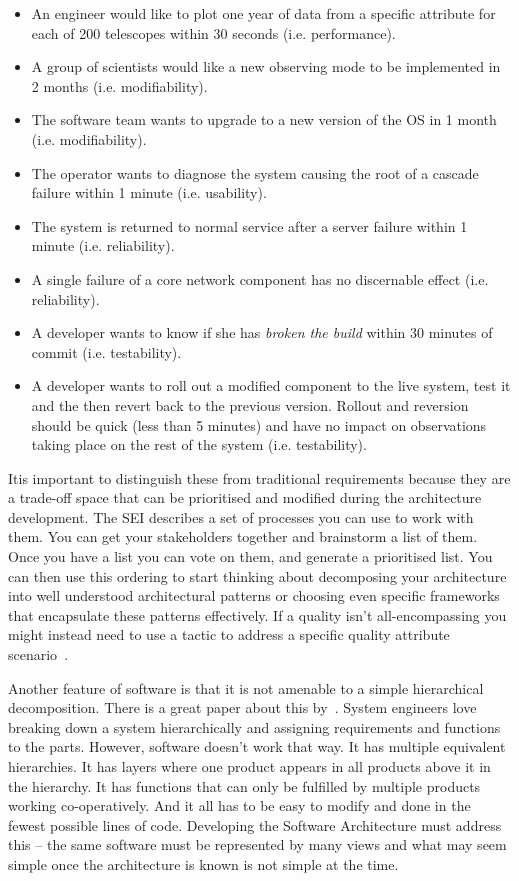 \documentclass[11pt,twoside]{article}
\begin{document}
\begin{itemize}
	\item An engineer would like to plot one year of data from a specific attribute for each 
of 200 telescopes within 30 seconds (i.e. performance).
	\item A group of scientists would like a new observing mode to be implemented in 2 
months (i.e. modifiability). 
	\item The software team wants to upgrade to a new version of the OS in 1 month (i.e. 
modifiability). 
	\item The operator wants to diagnose the system causing the root of a cascade failure 
within 1 minute (i.e. usability). 
	\item The system is returned to normal service after a server failure within 1 minute 
(i.e. reliability). 
	\item A single failure of a core network component has no discernable effect (i.e. reliability). 
	\item A developer wants to know if she has \emph{broken the build} within 30 minutes of 
commit (i.e. testability).
	\item A developer wants to roll out a modified component to the live system, test it 
and the then revert back to the previous version. Rollout and reversion should be 
quick (less than 5 minutes) and have no impact on observations taking place on 
the rest of the system (i.e. testability). 
\end{itemize}

Itis important to distinguish these from traditional requirements because they are a 
trade-off space that can be prioritised and modified during the architecture development. 
The SEI describes a set of processes you can use to work with them. You can get your 
stakeholders together and brainstorm a list of them. Once you have a list you can vote 
on them, and generate a prioritised list. You can then use this ordering to start thinking 
about decomposing your architecture into well understood architectural patterns or 
choosing even specific frameworks that encapsulate these patterns effectively. If a quality 
isn't all-encompassing you might instead need to use a tactic to address a specific 
quality attribute scenario~\cite[see][]{clements2001,bass2012,cervantes2016}. 

Another feature of software is that it is not amenable to a simple hierarchical decomposition. 
There is a great paper about this by~\citet{maier2006}. System 
engineers love breaking down a system hierarchically and assigning requirements and 
functions to the parts. However, software doesn't work that way. It has multiple equivalent 
hierarchies. It has layers where one product appears in all products above it in 
the hierarchy. It has functions that can only be fulfilled by multiple products working 
co-operatively. And it all has to be easy to modify and done in the fewest possible lines 
of code. Developing the Software Architecture must address this -- the same software 
must be represented by many views and what may seem simple once the architecture is 
known is not simple at the time. 
\end{document}
